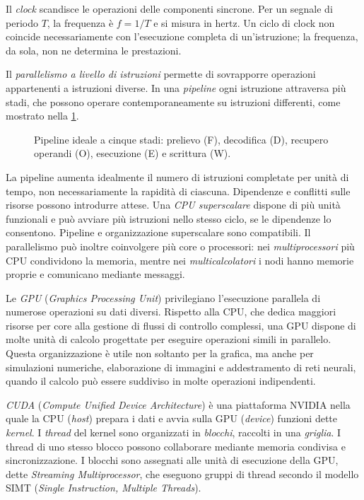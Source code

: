 Il \emph{clock} scandisce le operazioni delle componenti sincrone.
Per un segnale di periodo \(T\), la frequenza è \(f=1/T\) e si misura
in hertz. Un ciclo di clock non coincide necessariamente con
l'esecuzione completa di un'istruzione; la frequenza, da sola, non
ne determina le prestazioni.

Il \emph{parallelismo a livello di istruzioni} permette di
sovrapporre operazioni appartenenti a istruzioni diverse.
In una \emph{pipeline} ogni istruzione attraversa più stadi, che
possono operare contemporaneamente su istruzioni differenti,
come mostrato nella \cref{fig:fi-pipeline}.

\begin{figure}[htbp]
  \centering
  
  \caption{Pipeline ideale a cinque stadi: prelievo (F), decodifica (D),
  recupero operandi (O), esecuzione (E) e scrittura (W).}
  \label{fig:fi-pipeline}
\end{figure}

La pipeline aumenta idealmente il numero di istruzioni completate
per unità di tempo, non necessariamente la rapidità di ciascuna.
Dipendenze e conflitti sulle risorse possono introdurre attese.
Una \emph{CPU superscalare} dispone di più unità funzionali e può
avviare più istruzioni nello stesso ciclo, se le dipendenze lo
consentono. Pipeline e organizzazione superscalare sono compatibili.
Il parallelismo può inoltre coinvolgere più core o processori:
nei \emph{multiprocessori} più CPU condividono la memoria, mentre nei
\emph{multicalcolatori} i nodi hanno memorie proprie e comunicano
mediante messaggi.

Le \emph{GPU} (\emph{Graphics Processing Unit}) privilegiano
l'esecuzione parallela di numerose operazioni su dati diversi.
Rispetto alla CPU, che dedica maggiori risorse per core alla gestione
di flussi di controllo complessi, una GPU dispone di molte unità
di calcolo progettate per eseguire operazioni simili in parallelo.
Questa organizzazione è utile non soltanto per la grafica, ma anche
per simulazioni numeriche, elaborazione di immagini e addestramento
di reti neurali, quando il calcolo può essere suddiviso in molte
operazioni indipendenti.

\emph{CUDA} (\emph{Compute Unified Device Architecture}) è una
piattaforma NVIDIA nella quale la CPU (\emph{host}) prepara i dati
e avvia sulla GPU (\emph{device}) funzioni dette \emph{kernel}.
I \emph{thread} del kernel sono organizzati in \emph{blocchi},
raccolti in una \emph{griglia}. I thread di uno stesso blocco
possono collaborare mediante memoria condivisa e sincronizzazione.
I blocchi sono assegnati alle unità di esecuzione della GPU,
dette \emph{Streaming Multiprocessor}, che eseguono gruppi di thread
secondo il modello SIMT (\emph{Single Instruction, Multiple Threads}).


